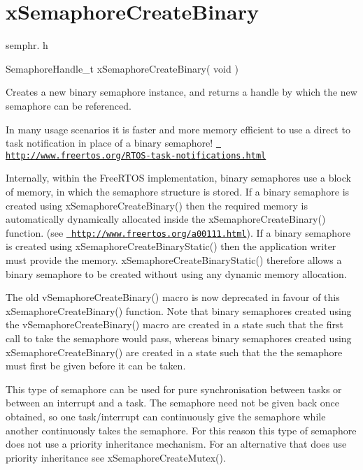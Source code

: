 \hypertarget{group__x_semaphore_create_binary}{}\section{x\+Semaphore\+Create\+Binary}
\label{group__x_semaphore_create_binary}
semphr. h 
\begin{DoxyPre}SemaphoreHandle\_t xSemaphoreCreateBinary( void )\end{DoxyPre}


Creates a new binary semaphore instance, and returns a handle by which the new semaphore can be referenced.

In many usage scenarios it is faster and more memory efficient to use a direct to task notification in place of a binary semaphore! \href{http://www.freertos.org/RTOS-task-notifications.html}{\texttt{ http\+://www.\+freertos.\+org/\+R\+T\+O\+S-\/task-\/notifications.\+html}}

Internally, within the Free\+R\+T\+OS implementation, binary semaphores use a block of memory, in which the semaphore structure is stored. If a binary semaphore is created using x\+Semaphore\+Create\+Binary() then the required memory is automatically dynamically allocated inside the x\+Semaphore\+Create\+Binary() function. (see \href{http://www.freertos.org/a00111.html}{\texttt{ http\+://www.\+freertos.\+org/a00111.\+html}}). If a binary semaphore is created using x\+Semaphore\+Create\+Binary\+Static() then the application writer must provide the memory. x\+Semaphore\+Create\+Binary\+Static() therefore allows a binary semaphore to be created without using any dynamic memory allocation.

The old v\+Semaphore\+Create\+Binary() macro is now deprecated in favour of this x\+Semaphore\+Create\+Binary() function. Note that binary semaphores created using the v\+Semaphore\+Create\+Binary() macro are created in a state such that the first call to \textquotesingle{}take\textquotesingle{} the semaphore would pass, whereas binary semaphores created using x\+Semaphore\+Create\+Binary() are created in a state such that the the semaphore must first be \textquotesingle{}given\textquotesingle{} before it can be \textquotesingle{}taken\textquotesingle{}.

This type of semaphore can be used for pure synchronisation between tasks or between an interrupt and a task. The semaphore need not be given back once obtained, so one task/interrupt can continuously \textquotesingle{}give\textquotesingle{} the semaphore while another continuously \textquotesingle{}takes\textquotesingle{} the semaphore. For this reason this type of semaphore does not use a priority inheritance mechanism. For an alternative that does use priority inheritance see x\+Semaphore\+Create\+Mutex().

